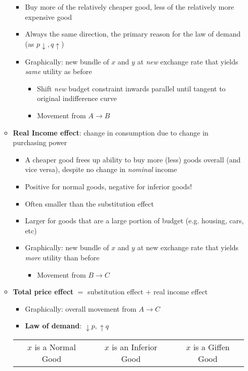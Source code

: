 \documentclass{article}
\begin{document}
\begin{itemize}
\begin{itemize}
		\begin{itemize}
			\item Buy more of the relatively cheaper good, less of the relatively more expensive good
			\item Always the same direction, the primary reason for the law of demand (as $p \downarrow, q \uparrow$)
			\item Graphically: new bundle of $x$ and $y$ at \emph{new} exchange rate that yields \emph{same} utility as before
			\begin{itemize}
				\item Shift \emph{new} budget constraint inwards parallel until tangent to original indifference curve
				\item Movement from $A \rightarrow B$
			\end{itemize}
		\end{itemize}
		\item \textbf{Real Income effect}: change in consumption due to change in purchasing power
		\begin{itemize}
			\item A cheaper good frees up ability to buy more (less) goods overall (and vice versa), despite no change in \emph{nominal} income
			\item Positive for normal goods, negative for inferior goods! 
			\item Often smaller than the substitution effect
			\item Larger for goods that are a large portion of budget (e.g. housing, cars, etc) 
			\item Graphically: new bundle of $x$ and $y$ at new exchange rate that yields \emph{more} utility than before
			\begin{itemize}
				\item Movement from $B \rightarrow C$
			\end{itemize}
		\end{itemize}
		\item \textbf{Total price effect} $=$ substitution effect $+$ real income effect
		\begin{itemize}
			\item Graphically: overall movement from $A \rightarrow C$
			\item \textbf{Law of demand}: $\downarrow p, \uparrow q$
		\end{itemize}		
		\begin{table}[h!]
		\centering 
		\begin{tabular}{ccc}
$x$ is a Normal Good & $x$ is an Inferior Good & $x$ is a Giffen Good\\

\end{tabular}
\end{table}
\end{itemize}
\end{itemize}
\end{document}
